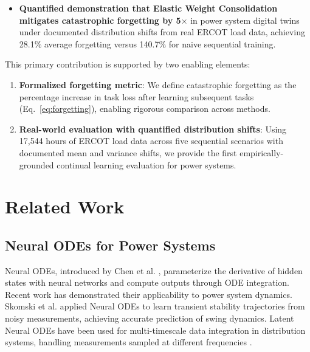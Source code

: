 \documentclass[journal,12pt,onecolumn]{IEEEtran}
\begin{document}
\begin{itemize}
    \item \textbf{Quantified demonstration that Elastic Weight Consolidation mitigates catastrophic forgetting by 5$\times$} in power system digital twins under documented distribution shifts from real ERCOT load data, achieving 28.1\% average forgetting versus 140.7\% for naive sequential training.
\end{itemize}

This primary contribution is supported by two enabling elements:

\begin{enumerate}
    \item \textbf{Formalized forgetting metric}: We define catastrophic forgetting as the percentage increase in task loss after learning subsequent tasks (Eq.~\ref{eq:forgetting}), enabling rigorous comparison across methods.
    
    \item \textbf{Real-world evaluation with quantified distribution shifts}: Using 17,544 hours of ERCOT load data across five sequential scenarios with documented mean and variance shifts, we provide the first empirically-grounded continual learning evaluation for power systems.
\end{enumerate}

\section{Related Work}
\label{sec:related_work}

\subsection{Neural ODEs for Power Systems}

Neural ODEs, introduced by Chen et al. \cite{ref5}, parameterize the derivative of hidden states with neural networks and compute outputs through ODE integration. Recent work has demonstrated their applicability to power system dynamics. Skomski et al. \cite{ref6} applied Neural ODEs to learn transient stability trajectories from noisy measurements, achieving accurate prediction of swing dynamics. Latent Neural ODEs have been used for multi-timescale data integration in distribution systems, handling measurements sampled at different frequencies \cite{ref7}.
\end{document}
